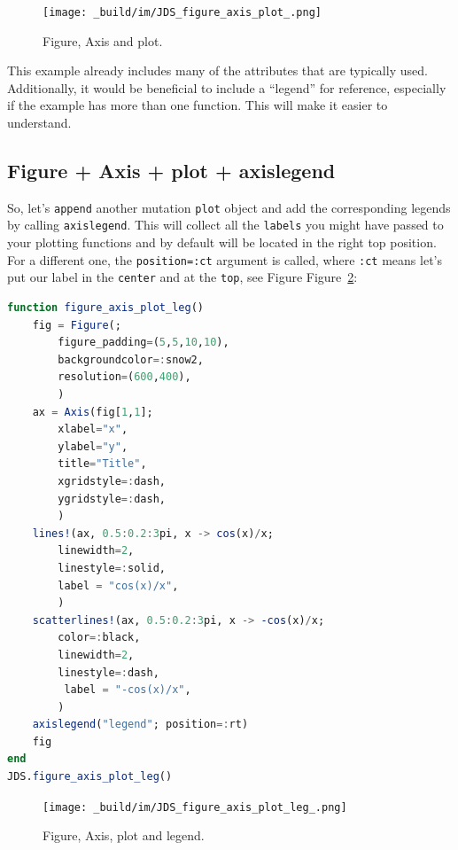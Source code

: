 \documentclass[
  notoc %
]{tufte-book}
\newcommand{\passthrough}[1]{#1}
\begin{document}
\begin{figure}
\hypertarget{fig:fig_axis_plot}{%
\centering
\texttt{[image: \_build/im/JDS\_figure\_axis\_plot\_.png]}
\caption{Figure, Axis and plot.}\label{fig:fig_axis_plot}
}
\end{figure}

This example already includes many of the attributes that are typically
used. Additionally, it would be beneficial to include a ``legend'' for
reference, especially if the example has more than one function. This
will make it easier to understand.

\hypertarget{figure-axis-plot-axislegend}{%
\subsection{Figure + Axis + plot +
axislegend}\label{figure-axis-plot-axislegend}}

So, let's \passthrough{\lstinline!append!} another mutation
\passthrough{\lstinline!plot!} object and add the corresponding legends
by calling \passthrough{\lstinline!axislegend!}. This will collect all
the \passthrough{\lstinline!labels!} you might have passed to your
plotting functions and by default will be located in the right top
position. For a different one, the
\passthrough{\lstinline!position=:ct!} argument is called, where
\passthrough{\lstinline!:ct!} means let's put our label in the
\passthrough{\lstinline!center!} and at the
\passthrough{\lstinline!top!}, see Figure Figure~\ref{fig:plot_legend}:

\begin{lstlisting}[language=Julia]
function figure_axis_plot_leg()
    fig = Figure(;
        figure_padding=(5,5,10,10),
        backgroundcolor=:snow2,
        resolution=(600,400),
        )
    ax = Axis(fig[1,1];
        xlabel="x",
        ylabel="y",
        title="Title",
        xgridstyle=:dash,
        ygridstyle=:dash,
        )
    lines!(ax, 0.5:0.2:3pi, x -> cos(x)/x;
        linewidth=2,
        linestyle=:solid,
        label = "cos(x)/x",
        )
    scatterlines!(ax, 0.5:0.2:3pi, x -> -cos(x)/x;
        color=:black,
        linewidth=2,
        linestyle=:dash,
         label = "-cos(x)/x",
        )
    axislegend("legend"; position=:rt)
    fig
end
JDS.figure_axis_plot_leg()
\end{lstlisting}

\begin{figure}
\hypertarget{fig:plot_legend}{%
\centering
\texttt{[image: \_build/im/JDS\_figure\_axis\_plot\_leg\_.png]}
\caption{Figure, Axis, plot and legend.}\label{fig:plot_legend}
}
\end{figure}
\end{document}
